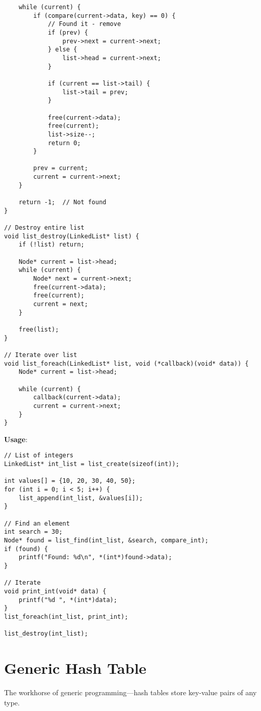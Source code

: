 \begin{lstlisting}
    while (current) {
        if (compare(current->data, key) == 0) {
            // Found it - remove
            if (prev) {
                prev->next = current->next;
            } else {
                list->head = current->next;
            }

            if (current == list->tail) {
                list->tail = prev;
            }

            free(current->data);
            free(current);
            list->size--;
            return 0;
        }

        prev = current;
        current = current->next;
    }

    return -1;  // Not found
}

// Destroy entire list
void list_destroy(LinkedList* list) {
    if (!list) return;

    Node* current = list->head;
    while (current) {
        Node* next = current->next;
        free(current->data);
        free(current);
        current = next;
    }

    free(list);
}

// Iterate over list
void list_foreach(LinkedList* list, void (*callback)(void* data)) {
    Node* current = list->head;

    while (current) {
        callback(current->data);
        current = current->next;
    }
}
\end{lstlisting}

\textbf{Usage}:

\begin{lstlisting}
// List of integers
LinkedList* int_list = list_create(sizeof(int));

int values[] = {10, 20, 30, 40, 50};
for (int i = 0; i < 5; i++) {
    list_append(int_list, &values[i]);
}

// Find an element
int search = 30;
Node* found = list_find(int_list, &search, compare_int);
if (found) {
    printf("Found: %d\n", *(int*)found->data);
}

// Iterate
void print_int(void* data) {
    printf("%d ", *(int*)data);
}
list_foreach(int_list, print_int);

list_destroy(int_list);
\end{lstlisting}

\section{Generic Hash Table}

The workhorse of generic programming---hash tables store key-value pairs of any type.

